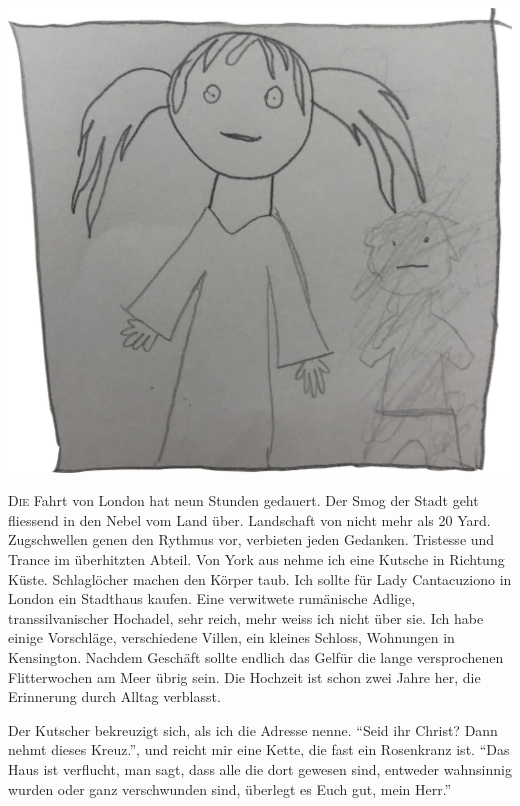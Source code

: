 ﻿\thispagestyle{empty}
\begin{center}
\includegraphics[width=\textwidth]{./bilder/wheterby2.png}
\end{center}
\vspace*{\fill}
{\centering\fontsize{50}{48} \color{farbe}\par}
\newpage
\lettrine[lines=3, lhang=.2, loversize=.25, lraise=0.05, findent=0.1em,
nindent=0em]{D}{ie} Fahrt von London hat neun Stunden gedauert. Der Smog der Stadt geht fliessend in den Nebel vom Land über. Landschaft von nicht mehr als 20 Yard. Zugschwellen genen den Rythmus vor, verbieten jeden Gedanken. Tristesse und Trance im überhitzten Abteil. Von York aus nehme ich eine Kutsche in Richtung Küste. Schlaglöcher machen den Körper taub. Ich sollte für Lady Cantacuziono in London ein Stadthaus kaufen. Eine verwitwete rumänische Adlige, transsilvanischer Hochadel, sehr reich, mehr weiss ich nicht über sie. Ich habe einige Vorschläge, verschiedene Villen, ein kleines Schloss, Wohnungen in Kensington. Nachdem Geschäft sollte endlich das Gelfür die lange versprochenen Flitterwochen am Meer übrig sein. Die Hochzeit ist schon zwei Jahre her, die Erinnerung durch Alltag verblasst.

Der Kutscher bekreuzigt sich, als ich die Adresse nenne. \enquote{Seid ihr Christ? Dann nehmt dieses Kreuz.}, und reicht mir eine Kette, die fast ein Rosenkranz ist. \enquote{Das Haus ist verflucht, man sagt, dass alle die dort gewesen sind, entweder wahnsinnig wurden oder ganz verschwunden sind, überlegt es Euch gut, mein Herr.} 

